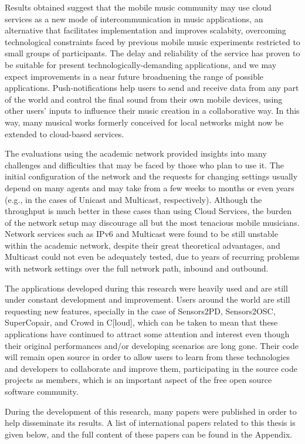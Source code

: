 Results obtained suggest that the mobile music community may use cloud services as a new mode of intercommunication in music applications, an alternative that facilitates implementation and improves scalabity, overcoming technological constraints faced by previous mobile music experiments restricted to small groups of participants.
The delay and reliability of the service has proven to be suitable for present technologically-demanding applications, and we may expect improvements in a near future broadnening the range of possible applications.
Push-notifications help users to send and receive data from any part of the world and control the final sound from their own mobile devices, using other users' inputs to influence their music creation in a collaborative way.
In this way, many musical works formerly conceived for local networks might now be extended to cloud-based services.

The evaluations using the academic network provided insights into many challenges and difficulties that may be faced by those who plan to use it.
The initial configuration of the network and the requests for changing settings usually depend on many agents and may take from a few weeks to months or even years (e.g., in the cases of Unicast and Multicast, respectively).
Although the throughput is much better in these cases than using Cloud Services, the burden of the network setup may discourage all but the most tenacious mobile musicians.
Network services such as IPv6 and Multicast were found to be still unstable within the academic network, despite their great theoretical advantages, and Multicast could not even be adequately tested, due to years of recurring problems with network settings over the full network path, inbound and outbound.

The applications developed during this research were heavily used and are still under constant development and improvement.
Users around the world are still requesting new features, specially in the case of Sensors2PD, Sensors2OSC, SuperCopair, and Crowd in C[loud], which can be taken to mean that these applications have continued to attract some attention and interest even though their original performances and/or developing scenarios are long gone.
Their code will remain open source in order to allow users to learn from these technologies and developers to collaborate and improve them, participating in the source code projects as members, which is an important aspect of the free open source software community.

During the development of this research, many papers were published in order to help disseminate its results.
A list of international papers related to this thesis is given below, and the full content of these papers can be found in the Appendix.

